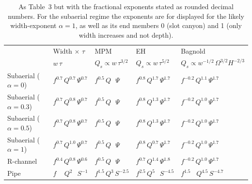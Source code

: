 \documentclass[esurf, manuscript]{copernicus}
\begin{document}
\begin{table}
  \caption{As Table~3 but with the fractional exponents stated as rounded decimal numbers.  For the subaerial regime the exponents are for displayed for the likely width-exponent $\alpha=1$, as well as its end members 0 (slot canyon) and 1 (only width increases and not depth).
  }
  \small
  \label{tab:Qs2}
  \begin{tabular}{lllll}
    & Width \(\times \,\, \tau\) & MPM & EH & Bagnold\\
    & \(w\, \tau\) & \(Q_s \propto w\, \tau^{3/2}\) & \(Q_s \propto w\, \tau^{5/2}\) & \(Q_s \propto w^{-1/2}\, \Omega^{3/2} H^{-2/3}\)\\
    \hline
    Subaerial (\(\alpha=0\)) & \(f^{0.7}\, Q^{0.7}\,  \Psi^{0.7}\) & \(f^{0.5}\, Q \,\,\,\, \Psi\) & \(f^{0.8}\, Q^{1.7} \, \Psi^{1.7}\) & \(f^{-0.2}\, Q^{1.1} \, \Psi^{1.7}\)\\
    Subaerial (\(\alpha=0.3\)) & \(f^{0.7}\, Q^{0.8}\,  \Psi^{0.7}\) & \(f^{0.5}\, Q \,\,\,\, \Psi\) & \(f^{0.8}\, Q^{1.3} \, \Psi^{1.7}\) & \(f^{-0.2}\, Q^{1.0} \, \Psi^{1.7}\)\\
    Subaerial (\(\alpha=0.5\)) & \(f^{0.7}\, Q^{0.8}\,  \Psi^{0.7}\) & \(f^{0.5}\, Q \,\,\,\, \Psi\) & \(f^{0.8}\, Q^{1.3} \, \Psi^{1.7}\) & \(f^{-0.2}\, Q^{1.0} \, \Psi^{1.7}\)\\
    Subaerial (\(\alpha=1\)) & \(f^{0.7}\, Q^{1.0}\,  \Psi^{0.7}\) & \(f^{0.5}\, Q \,\,\,\, \Psi\) & \(f^{0.8}\, Q^{0.7} \, \Psi^{1.7}\) & \(f^{-0.2}\, Q^{1.0} \, \Psi^{1.7}\)\\[3pt]
    R-channel & \(f^{0.4}\, Q^{0.8} \, \Psi^{0.6}\) & \(f^{0.5}\, Q \,\,\,\, \Psi\) & \(f^{0.7}\, Q^{1.4}\, \Psi^{1.8}\) & \(f^{-0.2}\, Q^{1.0} \, \Psi^{1.7}\)\\
    Pipe & \(f \,\quad Q^{2\phantom{.0}} \, S^{-1}\) & \(f^{1.5}\, Q^3 \, S^{-2.5}\) & \(f^{2.5}\, Q^{5\phantom{.0}}\, S^{-4.5}\) & \(f^{1.5} \,\,\,\,\, Q^{4.5} \, S^{-4.7}\)\\
  \end{tabular}
\end{table}





% 

\end{document}
